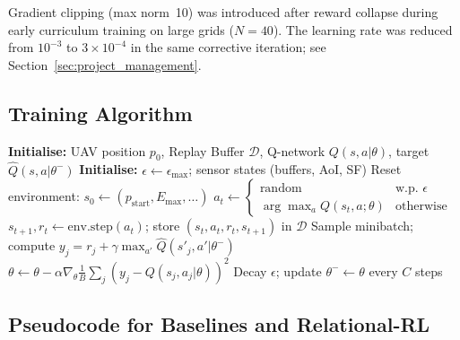 \noindent Gradient clipping (max norm~10) was introduced after reward collapse
during early curriculum training on large grids ($N=40$).
The learning rate was reduced from $10^{-3}$ to $3 \times 10^{-4}$ in the same corrective
iteration; see Section~\ref{sec:project_management}.

\subsection*{Training Algorithm}

\begin{algorithm}[h]
\caption{Protocol-Aware DQN Training for UAV Data Collection}
\label{alg:dqn_full}
\begin{algorithmic}[1]
    \State \textbf{Initialise:} UAV position $p_0$, Replay Buffer $\mathcal{D}$, Q-network $Q(s,a|\theta)$, target $\hat{Q}(s,a|\theta^-)$
    \State \textbf{Initialise:} $\epsilon \leftarrow \epsilon_{\max}$; sensor states (buffers, AoI, SF)
        \State Reset environment: $s_0 \leftarrow (p_{\text{start}}, E_{\max}, \ldots)$
            \State $a_t \leftarrow \begin{cases} \text{random} & \text{w.p.\ } \epsilon \\ \arg\max_a Q(s_t,a;\theta) & \text{otherwise} \end{cases}$
            \State $s_{t+1}, r_t \leftarrow \text{env.step}(a_t)$; store $(s_t,a_t,r_t,s_{t+1})$ in $\mathcal{D}$
                \State Sample minibatch; compute $y_j = r_j + \gamma \max_{a'}\hat{Q}(s'_j,a'|\theta^-)$
                \State $\theta \leftarrow \theta - \alpha \nabla_\theta \frac{1}{B}\sum_j (y_j - Q(s_j,a_j|\theta))^2$
            \EndIf
        \EndWhile
        \State Decay $\epsilon$; update $\theta^- \leftarrow \theta$ every $C$ steps
    \EndFor
\end{algorithmic}
\end{algorithm}

\subsection*{Pseudocode for Baselines and Relational-RL}

